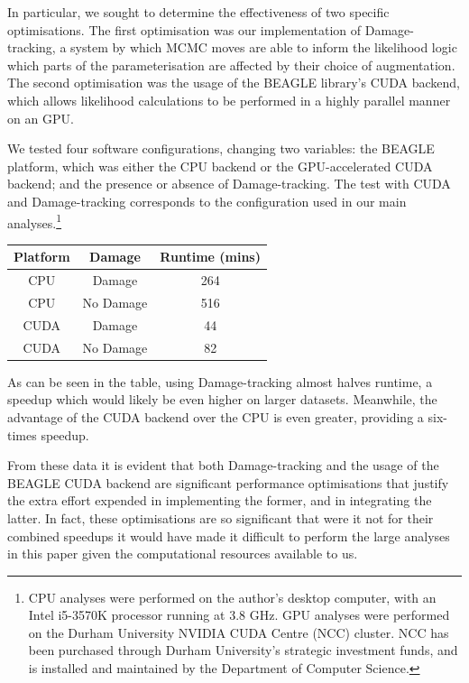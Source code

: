\documentclass[10pt,journal,compsoc]{IEEEtran}
\begin{document}
In particular, we sought to determine the effectiveness of two specific optimisations. The first optimisation was our implementation of Damage-tracking, a system by which MCMC moves are able to inform the likelihood logic which parts of the parameterisation are affected by their choice of augmentation. The second optimisation was the usage of the BEAGLE library's CUDA backend, which allows likelihood calculations to be performed in a highly parallel manner on an GPU.

We tested four software configurations, changing two variables: the BEAGLE platform, which was either the CPU backend or the GPU-accelerated CUDA backend; and the presence or absence of Damage-tracking. The test with CUDA and Damage-tracking corresponds to the configuration used in our main analyses.\footnote{CPU analyses were performed on the author's desktop computer, with an Intel i5-3570K processor running at 3.8 GHz. GPU analyses were performed on the Durham University NVIDIA CUDA Centre (NCC) cluster. NCC has been purchased through Durham University's strategic investment funds, and is installed and maintained by the Department of Computer Science.}

\begin{center}

\begin{tabular}{ |c|c|c| }
    \hline
    Platform & Damage & Runtime (mins) \\
    \hline
    CPU& Damage & 264 \\
    CPU& No Damage & 516 \\
    CUDA& Damage & 44 \\
    CUDA& No Damage & 82 \\
    \hline
\end{tabular}

\end{center}

As can be seen in the table, using Damage-tracking almost halves runtime, a speedup which would likely be even higher on larger datasets. Meanwhile, the advantage of the CUDA backend over the CPU is even greater, providing a six-times speedup.

From these data it is evident that both Damage-tracking and the usage of the BEAGLE CUDA backend are significant performance optimisations that justify the extra effort expended in implementing the former, and in integrating the latter. In fact, these optimisations are so significant that were it not for their combined speedups it would have made it difficult to perform the large analyses in this paper given the computational resources available to us.
\end{document}
